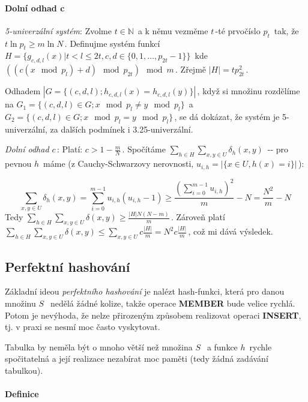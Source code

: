 \paragraph{Dolní odhad c}\label{dolnuxed-odhad-c}

\emph{5-univerzální systém}: Zvolme \(t\in\mathbb{N}\,\!\) a k němu
vezměme \(t\,\!\)-té prvočíslo \(p_t\,\!\) tak, že
\(t\ln p_t\geq m\ln N\,\!\). Definujme systém funkcí
\(H=\{g_{c,d,l}(x)|t<l\leq 2t, c, d\in\{0,1,\dots,p_{2t}-1\}\}\,\!\) kde
\(((c(x\mod p_l)+d)\mod p_{2t})\mod m\,\!\). Zřejmě
\(|H|=tp_{2t}^2\,\!\).

Odhadem \(|G = \{(c,d,l); h_{c,d,l}(x)=h_{c,d,l}(y)\}|\,\!\), když si
množinu rozdělíme na
\(G_1 = \{(c,d,l)\in G; x\mod p_l \neq y\mod p_l\}\,\!\) a
\(G_2 =\{(c,d,l)\in G;x\mod p_l=y\mod p_l\}\,\!\), se dá dokázat, že
systém je 5-univerzální, za dalších podmínek i 3.25-univerzální.

\emph{Dolní odhad \(c\,\!\)}: Platí: \(c>1-\frac{m}{N}\,\!\). Spočítáme
\(\sum_{h\in H}\sum_{x,y\in U}\delta_h(x,y)\,\!\) -\/- pro pevnou
\(h\,\!\) máme (z Cauchy-Schwarzovy nerovnosti,
\(u_{i,h}=|\{x\in U,h(x)=i\}|\,\!\)):

\[\sum_{x,y\in U}\delta_h(x,y)=\sum_{i=0}^{m-1}u_{i,h}(u_{i,h}-1)\geq \frac{(\sum_{i=0}^{m-1}u_{i,h})^2}{m}-N =\frac{N^2}{m}-N\,\!\]
Tedy
\(\sum_{h\in H}\sum_{x,y\in U}\delta(x,y)\geq \frac{|H|N(N-m)}{m}\,\!\).
Zároveň platí
\(\sum_{h\in H}\sum_{x,y\in U}\delta(x,y)\leq\sum_{x,y\in U}c\frac{|H|}{m}=N^2c\frac{|H|}{m}\,\!\),
což mi dává výsledek.

\subsection{Perfektní hashování}\label{perfektnuxed-hashovuxe1nuxed}

Základní ideou \emph{perfektního hashování} je nalézt hash-funkci, která
pro danou množinu \(S\,\;\) nedělá žádné kolize, takže operace
\textbf{MEMBER} bude velice rychlá. Potom je nevýhoda, že nelze
přirozeným způsobem realizovat operaci \textbf{INSERT}, tj. v praxi se
nesmí moc často vyskytovat.

Tabulka by neměla být o mnoho větší než množina \(S\,\;\) a funkce
\(h\,\!\) rychle spočitatelná a její realizace nezabírat moc paměti
(tedy žádná zadávání tabulkou).

\paragraph{Definice}\label{definice}

